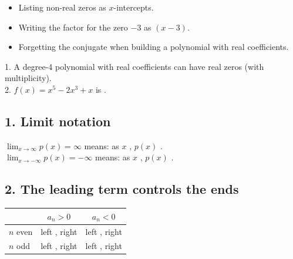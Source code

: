 \begin{mistakes}
\begin{itemize}
\item Listing non-real zeros as $x$-intercepts.
\item Writing the factor for the zero $-3$ as $(x-3)$.
\item Forgetting the conjugate when building a polynomial with real coefficients.
\end{itemize}
\end{mistakes}

\begin{quickcheck}
1. A degree-4 polynomial with real coefficients can have  real zeros (with multiplicity).\\
2. $f(x)=x^5-2x^3+x$ is .
\end{quickcheck}


\subsection*{1. Limit notation}
$\displaystyle\lim_{x\to\infty}p(x)=\infty$ means: as $x$ , $p(x)$ .\\
$\displaystyle\lim_{x\to-\infty}p(x)=-\infty$ means: as $x$ , $p(x)$ .

\subsection*{2. The leading term controls the ends}
\begin{keyidea}
\begin{center}\renewcommand{\arraystretch}{1.4}
\begin{tabular}{l|c|c}
& $a_n>0$ & $a_n<0$\\\hline
$n$ even & left \fillin{$\infty$}, right \fillin{$\infty$} & left \fillin{$-\infty$}, right \fillin{$-\infty$}\\\hline
$n$ odd & left \fillin{$-\infty$}, right \fillin{$\infty$} & left \fillin{$\infty$}, right \fillin{$-\infty$}
\end{tabular}\end{center}
\end{keyidea}


